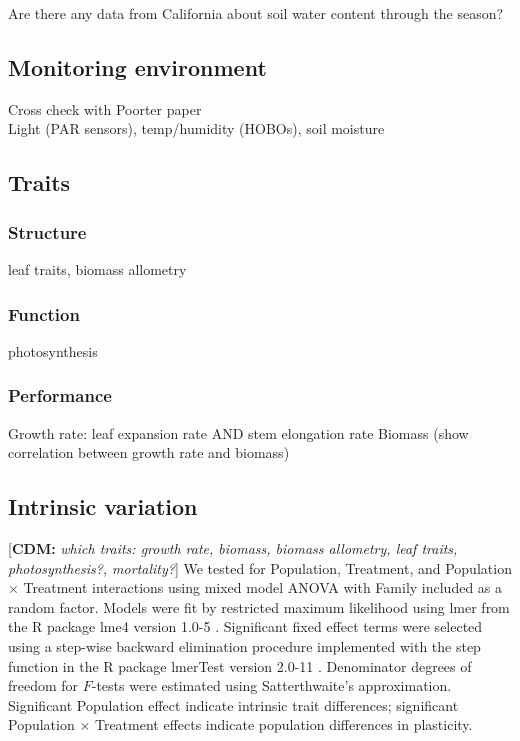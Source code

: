 \documentclass[11pt, oneside]{article}
\newcommand{\cdm}[1]{{ \color{magenta} [{\bf{CDM:}} {\em#1}]}} %
\begin{document}
			Are there any data from California about soil water content through the season?

\subsection*{Monitoring environment}

		Cross check with Poorter paper \\
		Light (PAR sensors), temp/humidity (HOBOs), soil moisture

\subsection*{Traits}

\subsubsection*{Structure}

leaf traits, biomass allometry

\subsubsection*{Function}

photosynthesis

\subsubsection*{Performance}

Growth rate: leaf expansion rate AND stem elongation rate
Biomass (show correlation between growth rate and biomass)

\subsection*{Intrinsic variation}

\cdm{which traits: growth rate, biomass, biomass allometry, leaf traits, photosynthesis?, mortality?}
We tested for Population, Treatment, and Population $\times$ Treatment interactions using mixed model ANOVA with Family included as a random factor. Models were fit by restricted maximum likelihood using lmer from the R package lme4 version 1.0-5 \citep{Bates_etal_2013}. Significant fixed effect terms were selected using a step-wise backward elimination procedure implemented with the step function in the R package lmerTest version 2.0-11 \citep{Kuznetsova_etal_2014}. Denominator degrees of freedom for $F$-tests were estimated using Satterthwaite's approximation. Significant Population effect indicate intrinsic trait differences; significant Population $\times$ Treatment effects indicate population differences in plasticity.
\end{document}
